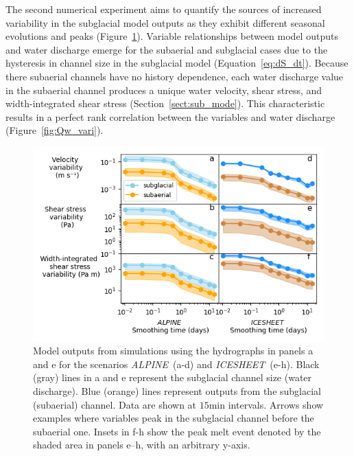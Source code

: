 \documentclass[esurf, manuscript]{copernicus}
\newcommand{\alpine}{\textit{ALPINE}\,}
\newcommand{\icesheet}{\textit{ICESHEET}\,}
\begin{document}
The second numerical experiment aims to quantify the sources of increased variability in the subglacial model outputs as they exhibit different seasonal evolutions and peaks (Figure~\ref{fig:model_outs}).
Variable relationships between model outputs and water discharge emerge for the subaerial and subglacial cases due to the hysteresis in channel size in the subglacial model (Equation~\ref{eq:dS_dt}).
Because there subaerial channels have no history dependence, each water discharge value in the subaerial channel produces a unique water velocity, shear stress, and width-integrated shear stress (Section~\ref{sect:sub_mode}).
This characteristic results in a perfect rank correlation between the variables and water discharge (Figure~\ref{fig:Qw_vari}).
\begin{figure}[hbt!]
  \centering
  \includegraphics[width=0.9\linewidth]{Fig5.png}
  \caption{Model outputs from simulations using the hydrographs in panels a and e for the scenarios \alpine{} (a-d) and \icesheet{} (e-h).
    Black (gray) lines in a and e represent the subglacial channel size (water discharge).
    Blue (orange) lines represent outputs from the subglacial (subaerial) channel.
    Data are shown at $15$\unit{min} intervals.
    Arrows show examples where variables peak in the subglacial channel before the subaerial one.
    Insets in f-h show the peak melt event denoted by the shaded area in panels e--h, with an arbitrary y-axis.
  }
  \label{fig:model_outs}
\end{figure}
\end{document}
